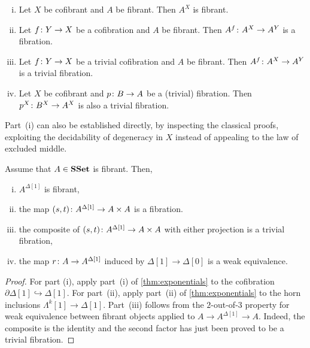 \documentclass[reqno,10pt,a4paper,oneside,draft]{amsart}
\begin{document}
\begin{lemma} \hfill 
 \label{thm:exponentials}
\begin{enumerate}[(i)] 
\item Let $X$ be cofibrant and $A$ be fibrant.  Then $A^X$ is fibrant.
\item Let $f \colon Y \rightarrow X$ be a cofibration and $A$ be fibrant. Then $A^f \colon A^X \rightarrow A^Y$ is a fibration.
\item Let $f \colon Y \rightarrow X$ be a trivial cofibration and $A$ be fibrant.  Then $A^f \colon A^X \rightarrow A^Y$ is a trivial fibration.
\item Let $X$ be cofibrant and $p \colon B \rightarrow A$ be a (trivial) fibration. Then $p^X \colon B^X \rightarrow A^X$ is also a trivial fibration.
\end{enumerate}
\end{lemma}

Part~(i) can also be established directly, by inspecting the classical proofs, exploiting the decidability of degeneracy in $X$ instead of appealing to the law of excluded middle.






\medskip



\begin{proposition} \label{thm:id-types-for-types}
Assume that $A \in \mathbf{SSet}$ is fibrant. Then,
\begin{enumerate}[(i)] 
\item $A^{\Delta[1]}$ is fibrant,
\item the map $(s,t) \colon A^{\Delta[1]} \rightarrow A \times A$ is a fibration.
\item the composite of $(s, t) \colon A^{\Delta[1]} \rightarrow A \times A$ with either projection is a trivial fibration,
\item the map $r \colon A \rightarrow A^{\Delta[1]}$ induced by $\Delta[1] \rightarrow \Delta[0]$ is a weak equivalence.
\end{enumerate}
\end{proposition} 

\begin{proof}
For part (i), apply part~(i) of \cref{thm:exponentials} to the cofibration $\partial \Delta[1]  \hookrightarrow \Delta[1]$. For part~(ii), apply part~(ii) of \cref{thm:exponentials} to the horn inclusions $\Lambda^k[1]  \rightarrow \Delta[1]$. Part~(iii) follows from the $2$-out-of-$3$ property for weak equivalence between fibrant objects applied to $A \rightarrow A^{\Delta[1]} \rightarrow A$. Indeed, the
composite is the identity and the second factor has just been proved to be a trivial fibration.
\end{proof}
\end{document}
